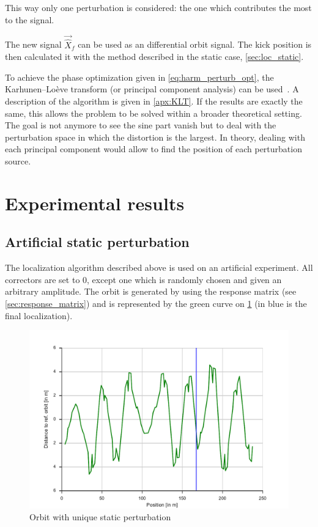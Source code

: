 This way only one perturbation is considered: the one which contributes the most to the signal.

The new signal $\vec{\hat{X}}_f$ can be used as an differential orbit signal. The kick position is then calculated it with the method described in the static case, \cref{sec:loc_static}.

\remark To achieve the phase optimization given in \cref{eq:harm_perturb_opt}, the Karhunen–Loève transform (or principal component analysis) can be used~\cite{book:wang_2012}. A description of the algorithm is given in \cref{apx:KLT}. If the results are exactly the same, this allows the problem to be solved within a broader theoretical setting. The goal is not anymore to see the sine part vanish but to deal with the perturbation space in which the distortion is the largest. In theory, dealing with each principal component would allow to find the position of each perturbation source.

\section{Experimental results}
\subsection{Artificial static perturbation}
The localization algorithm described above is used on an artificial experiment. All correctors are set to 0, except one which is randomly chosen and given an arbitrary amplitude. The orbit is generated by using the response matrix (see \cref{sec:response_matrix}) and is represented by the green curve on \cref{fig:loc_orbit} (in blue is the final localization).

\begin{figure}
    \centering
    \includegraphics[width=\linewidth]{img/loc_orbit}
    \caption{\label{fig:loc_orbit} Orbit with unique static perturbation}
\end{figure}

